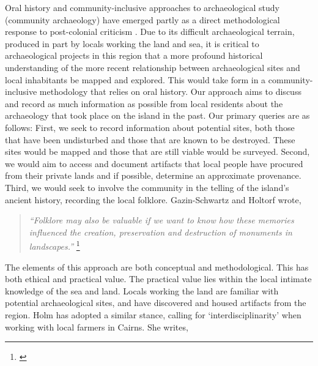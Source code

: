 Oral history and community-inclusive approaches to archaeological study (community archaeology) have emerged partly as a direct methodological response to post-colonial criticism \parencites{Smith_2005}{Hill_2011}{McNiven_2005}{Lyons_2013}{Lavin_2013}. Due to its difficult archaeological terrain, produced in part by locals working the land and sea, it is critical to archaeological projects in this region that a more profound historical understanding of the more recent relationship between archaeological sites and local inhabitants be mapped and explored. This would take form in a community-inclusive methodology that relies on oral history. Our approach aims to discuss and record as much information as possible from local residents about the archaeology that took place on the island in the past. Our primary queries are as follows: First, we seek to record information about potential sites, both those that have been undisturbed and those that are known to be destroyed. These sites would be mapped and those that are still viable would be surveyed. Second, we would aim to access and document artifacts that local people have procured from their private lands and if possible, determine an approximate provenance. Third, we would seek to involve the community in the telling of the island’s ancient history, recording the local folklore. Gazin-Schwartz and Holtorf wrote,

	\blockquote{\textit{“Folklore may also be valuable if we want to know how these memories influenced the creation, preservation and destruction of monuments in landscapes.”}
		\footnote{\textcite[15]{Gazin-Schwartz_1999}}}
	The elements of this approach are both conceptual and methodological. This has both ethical and practical value. The practical value lies within the local intimate knowledge of the sea and land. Locals working the land are familiar with potential archaeological sites, and have discovered and housed artifacts from the region. Holm has adopted a similar stance, calling for ‘interdisciplinarity’ when working with local farmers in Cairns. She writes,
	
